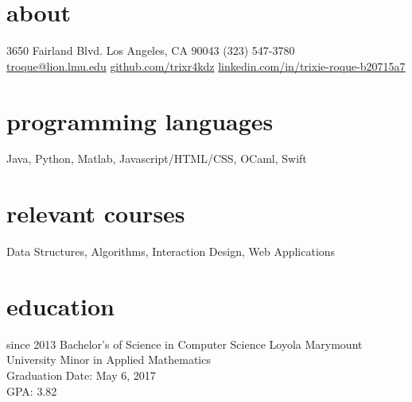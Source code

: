 \documentclass[]{friggeri-cv} %
\begin{document}


\begin{aside} %
  \section{about}
    3650 Fairland Blvd.
    Los Angeles, CA 90043
    (323) 547-3780
    ~
    \href{mailto:troque@lion.lmu.edu}{troque@lion.lmu.edu}
    \href{http://github.com/trixr4kdz}{github.com/trixr4kdz}
    \href{http://linkedin.com/in/trixie-roque-b20715a7}{linkedin.com/in/trixie-roque-b20715a7}
  \section{programming languages}
    Java, Python, Matlab, Javascript/HTML/CSS, OCaml, Swift
  \section{relevant courses}
     Data Structures,
     Algorithms,
     Interaction Design,
     Web Applications
\end{aside}


\section{education}

  \begin{entrylist}


    \entry
      {since 2013}
      {Bachelor's of Science {\normalfont in Computer Science}}
      {Loyola Marymount University}
      {Minor {\normalfont in Applied Mathematics} \\ 
      Graduation Date: May 6, 2017 \\
      GPA: 3.82}


\end{entrylist}
\end{document}
